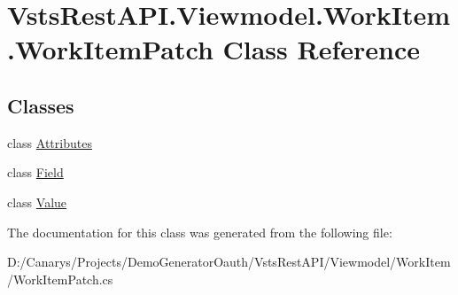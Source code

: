 \hypertarget{class_vsts_rest_a_p_i_1_1_viewmodel_1_1_work_item_1_1_work_item_patch}{}\section{Vsts\+Rest\+A\+P\+I.\+Viewmodel.\+Work\+Item.\+Work\+Item\+Patch Class Reference}
\label{class_vsts_rest_a_p_i_1_1_viewmodel_1_1_work_item_1_1_work_item_patch}
\subsection*{Classes}
\begin{DoxyCompactItemize}
\item 
class \mbox{\hyperlink{class_vsts_rest_a_p_i_1_1_viewmodel_1_1_work_item_1_1_work_item_patch_1_1_attributes}{Attributes}}
\item 
class \mbox{\hyperlink{class_vsts_rest_a_p_i_1_1_viewmodel_1_1_work_item_1_1_work_item_patch_1_1_field}{Field}}
\item 
class \mbox{\hyperlink{class_vsts_rest_a_p_i_1_1_viewmodel_1_1_work_item_1_1_work_item_patch_1_1_value}{Value}}
\end{DoxyCompactItemize}


The documentation for this class was generated from the following file\+:\begin{DoxyCompactItemize}
\item 
D\+:/\+Canarys/\+Projects/\+Demo\+Generator\+Oauth/\+Vsts\+Rest\+A\+P\+I/\+Viewmodel/\+Work\+Item/Work\+Item\+Patch.\+cs\end{DoxyCompactItemize}
